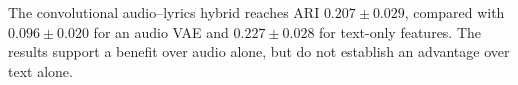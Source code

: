 The convolutional audio--lyrics hybrid reaches ARI $0.207\pm0.029$, compared with $0.096\pm0.020$ for an audio VAE and $0.227\pm0.028$ for text-only features. The results support a benefit over audio alone, but do not establish an advantage over text alone.
